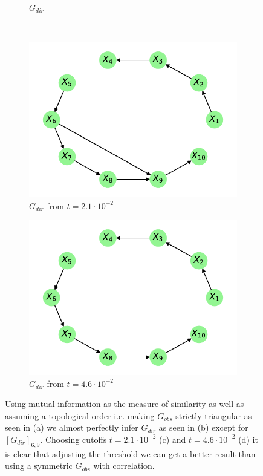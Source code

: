 \documentclass[../Thesis.tex]{subfiles}
\begin{document}
\begin{figure}[H]
\begin{subfigure}[t]{0.49\textwidth}
        \caption{$G_{dir}$}
    \end{subfigure}
    \\[\baselineskip]
    \begin{subfigure}[t]{0.49\textwidth}
        \centering
        \includegraphics[width=.9\linewidth]{figures/Gaussian Chain Theoretical/Chain graph from triangular G obs - MI - cutoff 2_1e-2.pdf}
        \caption{$G_{dir}$ from $t = 2.1\cdot 10^{-2}$}
    \end{subfigure}
    \hfill
    \begin{subfigure}[t]{0.49\textwidth}
        \centering
        \includegraphics[width=.9\linewidth]{figures/Gaussian Chain Theoretical/Chain graph from triangular G obs - MI - cutoff 4_6e-2.pdf}
        \caption{$G_{dir}$ from $t = 4.6\cdot 10^{-2}$}
    \end{subfigure}
    \caption{Using mutual information as the measure of similarity as well as assuming a topological order i.e. making $G_{obs}$ strictly triangular as seen in (a) we almost perfectly infer $G_{dir}$ as seen in (b) except for $\left[G_{dir}\right]_{6,9}$. Choosing cutoffs $t = 2.1\cdot 10^{-2}$ (c) and $t = 4.6\cdot 10^{-2}$ (d) it is clear that adjusting the threshold we can get a better result than using a symmetric $G_{obs}$ with correlation.}
    \label{fig:Gaussian chain triangular G_obs using mutual information}
\end{figure}
\end{document}
